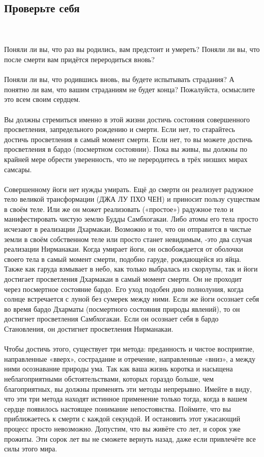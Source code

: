 \subsection{Проверьте себя}
\\ \\ Поняли ли вы, что раз вы родились, вам предстоит и умереть? Поняли ли вы, что после смерти вам придётся переродиться вновь?
\\ \\ Поняли ли вы, что родившись вновь, вы будете испытывать страдания? А понятно ли вам, что вашим страданиям не будет конца? Пожалуйста, осмыслите это всем своим сердцем.
\\ \\ Вы должны стремиться именно в этой жизни достичь состояния совершенного просветления, запредельного рождению и смерти. Если нет, то старайтесь достичь просветления в самый момент смерти. Если нет, то вы можете достичь просветления в бардо (посмертном состоянии). Пока вы живы, вы должны по крайней мере обрести уверенность, что не переродитесь в трёх низших мирах самсары.
\\ \\ Совершенному йоги нет нужды умирать. Ещё до смерти он реализует радужное тело великой трансформации (ДЖА ЛУ ПХО ЧЕН) и приносит пользу существам в своём теле. Или же он может реализовать («простое») радужное тело и манифестировать чистую землю Будды Самбхогакаи. Либо атомы его тела просто исчезают в реализации Дхармакаи. Возможно и то, что он отправится в чистые земли в своём собственном теле или просто станет невидимым, -это два случая реализации Нирманакаи. Когда умирает йоги, он освобождается от оболочки своего тела в самый момент смерти, подобно гаруде, рождающейся из яйца. Также как гаруда взмывает в небо, как только выбралась из скорлупы, так и йоги достигает просветления Дхармакаи в самый момент смерти. Он не проходит через посмертное состояние бардо. Его уход подобен дню полнолуния, когда солнце встречается с луной без сумерек между ними. Если же йоги осознает себя во время бардо Дхарматы (посмертного состояния природы явлений), то он достигнет просветления Самбхогакаи. Если он осознает себя в бардо Становления, он достигнет просветления Нирманакаи.
\\ \\ Чтобы достичь этого, существует три метода: преданность и чистое восприятие, направленные «вверх», сострадание и отречение, направленные «вниз», а между ними осознавание природы ума. Так как ваша жизнь коротка и насыщена неблагоприятными обстоятельствами, которых гораздо больше, чем благоприятных, вы должны применять эти методы непрерывно. Имейте в виду, что эти три метода находят истинное применение только тогда, когда в вашем сердце появилось настоящее понимание непостоянства. Поймите, что вы приближаетесь к смерти с каждой секундой. И остановить этот ужасающий процесс просто невозможно. Допустим, что вы живёте сто лет, и сорок уже прожиты. Эти сорок лет вы не сможете вернуть назад, даже если привлечёте все силы этого мира.
